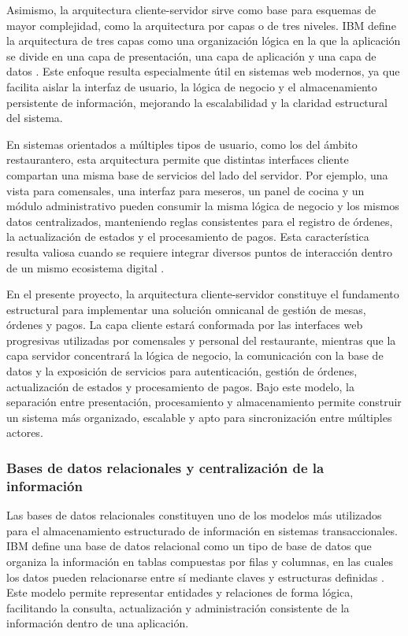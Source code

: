 \documentclass[12pt]{report}
\begin{document}
Asimismo, la arquitectura cliente-servidor sirve como base para esquemas de mayor complejidad, como la arquitectura por capas o de tres niveles. IBM define la arquitectura de tres capas como una organización lógica en la que la aplicación se divide en una capa de presentación, una capa de aplicación y una capa de datos \cite{ibm_three_tier_2025}. Este enfoque resulta especialmente útil en sistemas web modernos, ya que facilita aislar la interfaz de usuario, la lógica de negocio y el almacenamiento persistente de información, mejorando la escalabilidad y la claridad estructural del sistema.

En sistemas orientados a múltiples tipos de usuario, como los del ámbito restaurantero, esta arquitectura permite que distintas interfaces cliente compartan una misma base de servicios del lado del servidor. Por ejemplo, una vista para comensales, una interfaz para meseros, un panel de cocina y un módulo administrativo pueden consumir la misma lógica de negocio y los mismos datos centralizados, manteniendo reglas consistentes para el registro de órdenes, la actualización de estados y el procesamiento de pagos. Esta característica resulta valiosa cuando se requiere integrar diversos puntos de interacción dentro de un mismo ecosistema digital \cite{mdn_client_server_2025,ibm_networking_2025}.

En el presente proyecto, la arquitectura cliente-servidor constituye el fundamento estructural para implementar una solución omnicanal de gestión de mesas, órdenes y pagos. La capa cliente estará conformada por las interfaces web progresivas utilizadas por comensales y personal del restaurante, mientras que la capa servidor concentrará la lógica de negocio, la comunicación con la base de datos y la exposición de servicios para autenticación, gestión de órdenes, actualización de estados y procesamiento de pagos. Bajo este modelo, la separación entre presentación, procesamiento y almacenamiento permite construir un sistema más organizado, escalable y apto para sincronización entre múltiples actores.

\subsubsection{Bases de datos relacionales y centralización de la información}

Las bases de datos relacionales constituyen uno de los modelos más utilizados para el almacenamiento estructurado de información en sistemas transaccionales. IBM define una base de datos relacional como un tipo de base de datos que organiza la información en tablas compuestas por filas y columnas, en las cuales los datos pueden relacionarse entre sí mediante claves y estructuras definidas \cite{ibm_relational_database_2025,ibm_database_2025}. Este modelo permite representar entidades y relaciones de forma lógica, facilitando la consulta, actualización y administración consistente de la información dentro de una aplicación.
\end{document}

